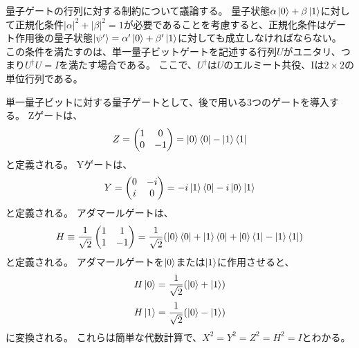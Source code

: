 量子ゲートの行列に対する制約について議論する。
量子状態$\alpha \ket{0} + \beta \ket{1}$に対して正規化条件$|\alpha|^2 + |\beta|^2 = 1$が必要であることを考慮すると、正規化条件はゲート作用後の量子状態$\ket{\psi'} = \alpha' \ket{0} + \beta' \ket{1}$に対しても成立しなければならない。
この条件を満たすのは、単一量子ビットゲートを記述する行列$U$がユニタリ、つまり$U^{\dagger}U = I$を満たす場合である。
ここで、$U^{\dagger}$は$U$のエルミート共役、Iは$2 \times 2$の単位行列である。

単一量子ビットに対する量子ゲートとして、後で用いる3つのゲートを導入する。
Zゲートは、
\begin{equation}
    Z = \begin{pmatrix}
        1 & 0 \\
        0 & -1
    \end{pmatrix}
    = \ket{0}\bra{0} - \ket{1}\bra{1}
\end{equation}
と定義される。
Yゲートは、
\begin{equation}
    Y = \begin{pmatrix}
        0 & -i \\
        i & 0
    \end{pmatrix}
    = -i \ket{1}\bra{0} - i \ket{0}\ket{1}
\end{equation}
と定義される。
アダマールゲートは、
\begin{equation}
    H \equiv \frac{1}{\sqrt{2}}\begin{pmatrix}
        1 & 1 \\
        1 & -1
    \end{pmatrix}
    = \frac{1}{\sqrt{2}}(\ket{0}\bra{0} + \ket{1}\bra{0} + \ket{0}\bra{1} - \ket{1}\bra{1})
\end{equation}
と定義される。
アダマールゲートを$\ket{0}$または$\ket{1}$に作用させると、
\begin{equation}
    H\ket{0} = \frac{1}{\sqrt{2}}(\ket{0} + \ket{1})
\end{equation}
\begin{equation}
    H \ket{1} = \frac{1}{\sqrt{2}}(\ket{0} - \ket{1})
\end{equation}
に変換される。
これらは簡単な代数計算で、$X^2 = Y^2 = Z^2 = H^2 = I$とわかる。

